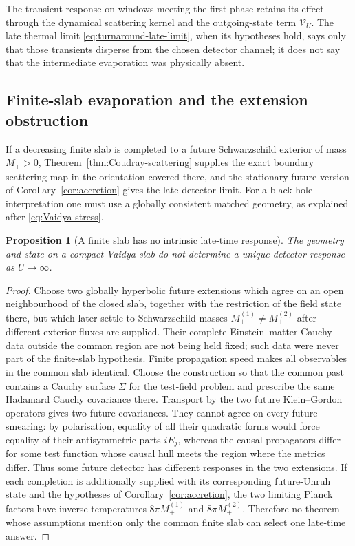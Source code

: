 \documentclass[11pt,a4paper]{article}
\newtheorem{proposition}[theorem]{Proposition}
\theoremstyle{definition}
\theoremstyle{remark}
\begin{document}
	The transient response on windows meeting the first phase retains its effect
	through the dynamical scattering kernel and the outgoing-state term
	$\mathcal V_U$.  The late thermal limit \eqref{eq:turnaround-late-limit}, when
	its hypotheses hold, says only that those transients disperse from the chosen
	detector channel; it does not say that the intermediate evaporation was
	physically absent.
	
	\subsection{Finite-slab evaporation and the extension obstruction}
	
	If a decreasing finite slab is completed to a future Schwarzschild exterior
	of mass $M_+>0$, Theorem~\ref{thm:Coudray-scattering} supplies the exact
	boundary scattering map in the orientation covered there, and the stationary
	future version of Corollary~\ref{cor:accretion} gives the late detector limit.
	For a black-hole interpretation one must use a globally consistent matched
	geometry, as explained after \eqref{eq:Vaidya-stress}.
	
	\begin{proposition}[A finite slab has no intrinsic late-time response]
		\label{prop:extension-obstruction}
		The geometry and state on a compact Vaidya slab do not determine a unique detector response as \(U\to\infty\).
	\end{proposition}
	
	\begin{proof}
		Choose two globally hyperbolic future extensions which agree on an open
		neighbourhood of the closed slab, together with the restriction of the field
		state there, but which later settle to Schwarzschild masses
		$M_+^{(1)}\neq M_+^{(2)}$ after different exterior fluxes are supplied.
		Their complete Einstein--matter Cauchy data outside the common region are not
		being held fixed; such data were never part of the finite-slab hypothesis.
		Finite propagation speed makes all observables in the common slab identical.
		Choose the construction so that the common past contains a Cauchy surface
		$\Sigma$ for the test-field problem and prescribe the same Hadamard Cauchy
		covariance there.  Transport by the two future Klein--Gordon operators gives
		two future covariances.  They cannot agree on every future smearing: by
		polarisation, equality of all their quadratic forms would force equality of
		their antisymmetric parts $iE_j$, whereas the causal propagators differ for
		some test function whose causal hull meets the region where the metrics
		differ.  Thus some future detector has different responses in the two
		extensions.  If each completion
		is additionally supplied with its corresponding future-Unruh state and the
		hypotheses of Corollary~\ref{cor:accretion}, the two limiting Planck factors
		have inverse temperatures $8\pi M_+^{(1)}$ and $8\pi M_+^{(2)}$.  Therefore no
		theorem whose assumptions mention only the common finite slab can select one
		late-time answer.
	\end{proof}
	
\end{document}
